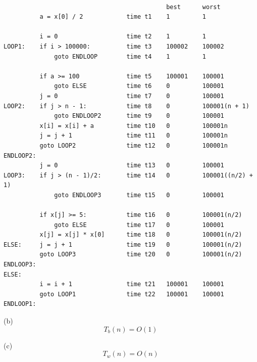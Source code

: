 
\begin{Verbatim}[frame=single]

                                             best      worst
          a = x[0] / 2            time t1    1         1

          i = 0                   time t2    1         1     
LOOP1:    if i > 100000:          time t3    100002    100002
              goto ENDLOOP        time t4    1         1

          if a >= 100             time t5    100001    100001
              goto ELSE           time t6    0         100001
          j = 0                   time t7    0         100001
LOOP2:    if j > n - 1:           time t8    0         100001(n + 1)
              goto ENDLOOP2       time t9    0         100001
          x[i] = x[i] + a         time t10   0         100001n
          j = j + 1               time t11   0         100001n
          goto LOOP2              time t12   0         100001n
ENDLOOP2:
          j = 0                   time t13   0         100001
LOOP3:    if j > (n - 1)/2:       time t14   0         100001((n/2) + 1)
              goto ENDLOOP3       time t15   0         100001

          if x[j] >= 5:           time t16   0         100001(n/2)
              goto ELSE           time t17   0         100001
          x[j] = x[j] * x[0]      time t18   0         100001(n/2)
ELSE:     j = j + 1               time t19   0         100001(n/2)
          goto LOOP3              time t20   0         100001(n/2)
ENDLOOP3:  
ELSE:
          i = i + 1               time t21   100001    100001
          goto LOOP1              time t22   100001    100001
ENDLOOP1:
\end{Verbatim}

(b)
\[
T_b(n) = O(1)
\]

(c)
\[
T_w(n) = O(n)
\]
